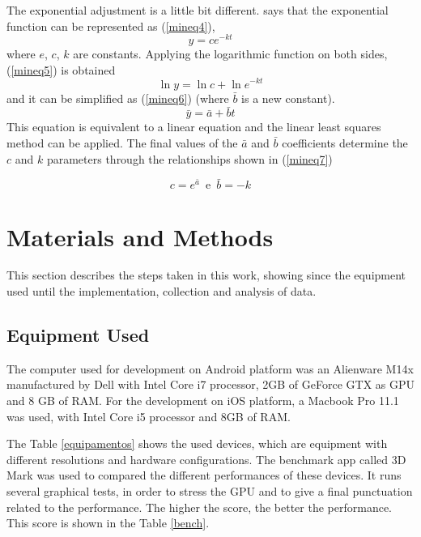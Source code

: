 \documentclass[10pt, conference, compsocconf]{IEEEtran}
\begin{document}
{The exponential adjustment is a little bit different. \cite{calculo} says
that the exponential function can be represented as (\ref{mineq4}),
\begin{equation}
	\label{mineq4}
		y = ce^{-kt}
	\end{equation}
where $e$, $c$, $k$ are constants. Applying the logarithmic function on
both sides, (\ref{mineq5}) is obtained \begin{equation}
	\label{mineq5}
		\ln{y} = \ln{c}  + \ln{e^{-kt}}
	\end{equation}
	and it can be simplified
as (\ref{mineq6}) (where $\bar{b}$ is a new constant). 
\begin{equation}
	\label{mineq6}
		\bar{y} = \bar{a} + \bar{b}t
	\end{equation}	
This equation
is equivalent to a linear equation and the linear least squares method can be applied.
The final values of the $\bar{a}$ and $\bar{b}$ coefficients determine
the $c$ and $k$ parameters through  the relationships shown in (\ref{mineq7})

\begin{equation}
  \label{mineq7}
	c = e^{\bar{a}}\, \, \, \mbox{e}\, \, \,\bar{b} = -k
	\end{equation} 
\section{Materials and Methods}
\label{sec:development}

This section describes the steps taken in this work, showing since the
equipment used until the implementation, collection and analysis of data.

\subsection{Equipment Used}
\label{equip}
The computer used for development on Android platform was an Alienware M14x
manufactured by Dell with Intel Core i7 processor, 2GB of GeForce GTX as GPU
and 8 GB of RAM. For the development on iOS platform, a Macbook Pro 11.1 was used, with Intel
Core i5 processor and 8GB of RAM.

  The Table \ref{equipamentos} shows the used devices, which are equipment with different
resolutions and hardware configurations. The benchmark app called
3D Mark was used to compared the different performances of these devices.
It runs several graphical tests, in order to 
stress the GPU and to give a final punctuation related to the performance. 
The higher the score, the better the performance. This score is shown
in the Table \ref{bench}.

}
\end{document}
